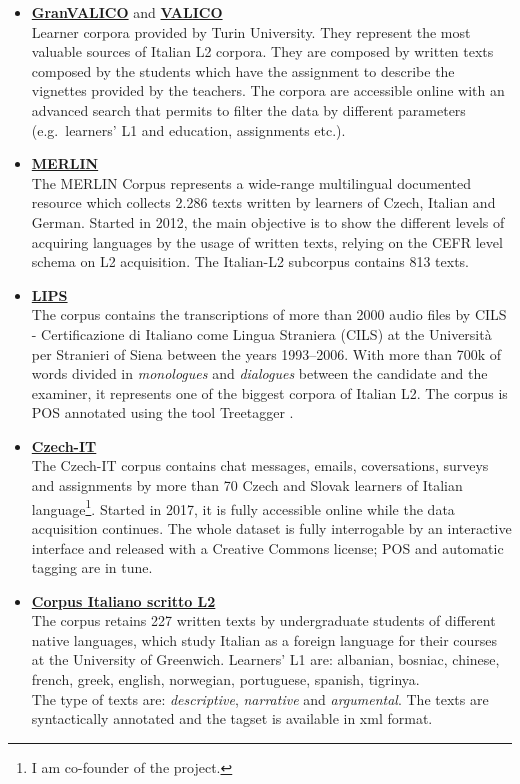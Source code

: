 \documentclass[a4paper,twoside,12pt,chapterprefix=false,bibliography=totocnumbered,listof=flat]{scrbook}
\theoremstyle{definition}
\theoremstyle{definition}
\theoremstyle{definition}
\theoremstyle{remark}
\begin{document}
\begin{itemize}
\item
  \textbf{\href{http://www.valico.org/valico_b_CORPUS.html}{GranVALICO}}
  and \textbf{\href{http://www.valico.org/valico_CORPUS.html}{VALICO}}
  \citep{valico}\\
  Learner corpora provided by Turin University. They represent the most
  valuable sources of Italian L2 corpora. They are composed by written
  texts composed by the students which have the assignment to describe
  the vignettes provided by the teachers. The corpora are accessible
  online with an advanced search that permits to filter the data by
  different parameters (e.g.~learners' L1 and education, assignments
  etc.).
\item
  \textbf{\href{http://merlin-platform.eu}{MERLIN}} \citep{merlin}\\
  The MERLIN Corpus represents a wide-range multilingual documented
  resource which collects 2.286 texts written by learners of Czech,
  Italian and German. Started in 2012, the main objective is to show the
  different levels of acquiring languages by the usage of written texts,
  relying on the CEFR level schema on L2 acquisition. The Italian-L2
  subcorpus contains 813 texts.
\item
  \textbf{\href{http://parlaritaliano.it/index.php/en/data/653-corpus-lips}{LIPS}}
  \citep{lips}\\
  The corpus contains the transcriptions of more than 2000 audio files
  by CILS - Certificazione di Italiano come Lingua Straniera (CILS) at
  the Università per Stranieri of Siena between the years 1993--2006.
  With more than 700k of words divided in \emph{monologues} and
  \emph{dialogues} between the candidate and the examiner, it represents
  one of the biggest corpora of Italian L2. The corpus is POS annotated
  using the tool Treetagger \citep{schmid1994}.
\item
  \textbf{\href{http://czech-it.github.io}{Czech-IT}} \citep{czech-it}\\
  The Czech-IT corpus contains chat messages, emails, coversations,
  surveys and assignments by more than 70 Czech and Slovak learners of
  Italian language\footnote{I am co-founder of the project.}. Started in
  2017, it is fully accessible online while the data acquisition
  continues. The whole dataset is fully interrogable by an interactive
  interface and released with a Creative Commons license; POS and
  automatic tagging are in tune.
\item
  \textbf{\href{http://www.parlaritaliano.it/index.php/it/corpora-di-parlato/662-corpus-italiano-scritto-l2}{Corpus
  Italiano scritto L2}} \citep{vogheraturco2010}\\
  The corpus retains 227 written texts by undergraduate students of
  different native languages, which study Italian as a foreign language
  for their courses at the University of Greenwich. Learners' L1 are:
  albanian, bosniac, chinese, french, greek, english, norwegian,
  portuguese, spanish, tigrinya.\\
  The type of texts are: \emph{descriptive}, \emph{narrative} and
  \emph{argumental}. The texts are syntactically annotated and the
  tagset is available in xml format.
\end{itemize}
\end{document}

